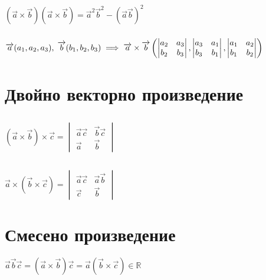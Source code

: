 \documentclass{article}
\newcommand{\vectr}{\overrightarrow}
\begin{document}
    \subsubsection{}
    \((\vectr{a} \times \vectr{b})(\vectr{a} \times \vectr{b}) = \vectr{a}^2 \vectr{b}^2 - (\vectr{a} \vectr{b})^2\)
    \subsubsection{}
    \(\vectr{a}(a_1, a_2, a_3), \; \vectr{b}(b_1, b_2, b_3)\\
    \\\implies \vectr{a} \times \vectr{b}\left(\begin{vmatrix}
        a_2 & a_3\\
        b_2 & b_3
    \end{vmatrix}, \begin{vmatrix}
        a_3 & a_1\\
        b_3 & b_1
    \end{vmatrix}, \begin{vmatrix}
        a_1 & a_2\\
        b_1 & b_2
    \end{vmatrix}\right)\)
    \section{Двойно векторно произведение}
    \subsection{}
    \((\vectr{a} \times \vectr{b}) \times \vectr{c} = \begin{vmatrix}
        \vectr{a}\vectr{c} & \vectr{b}\vectr{c}\\
        \vectr{a} & \vectr{b}
    \end{vmatrix}\)
    \subsection{}
    \(\vectr{a} \times (\vectr{b} \times \vectr{c}) = \begin{vmatrix}
        \vectr{a}\vectr{c} & \vectr{a}\vectr{b}\\
        \vectr{c} & \vectr{b}
    \end{vmatrix}\)
    \section{Смесено произведение}
    \(\vectr{a}\vectr{b}\vectr{c} = (\vectr{a} \times \vectr{b})\vectr{c} = \vectr{a}(\vectr{b} \times \vectr{c}) \in \mathbb{R}\)
\end{document}
